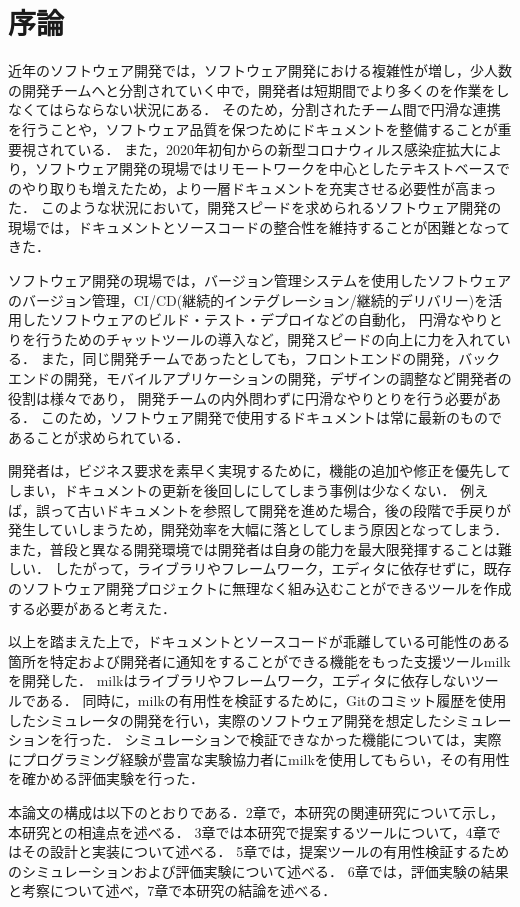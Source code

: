 \chapter{序論}
近年のソフトウェア開発では，ソフトウェア開発における複雑性が増し，少人数の開発チームへと分割されていく中で，開発者は短期間でより多くのを作業をしなくてはらならない状況にある．
そのため，分割されたチーム間で円滑な連携を行うことや，ソフトウェア品質を保つためにドキュメントを整備することが重要視されている．
また，2020年初旬からの新型コロナウィルス感染症拡大により，ソフトウェア開発の現場ではリモートワークを中心としたテキストベースでのやり取りも増えたため，より一層ドキュメントを充実させる必要性が高まった．
このような状況において，開発スピードを求められるソフトウェア開発の現場では，ドキュメントとソースコードの整合性を維持することが困難となってきた．

ソフトウェア開発の現場では，バージョン管理システムを使用したソフトウェアのバージョン管理，CI/CD(継続的インテグレーション/継続的デリバリー)を活用したソフトウェアのビルド・テスト・デプロイなどの自動化，
円滑なやりとりを行うためのチャットツールの導入など，開発スピードの向上に力を入れている．
また，同じ開発チームであったとしても，フロントエンドの開発，バックエンドの開発，モバイルアプリケーションの開発，デザインの調整など開発者の役割は様々であり，
開発チームの内外問わずに円滑なやりとりを行う必要がある．
このため，ソフトウェア開発で使用するドキュメントは常に最新のものであることが求められている．

開発者は，ビジネス要求を素早く実現するために，機能の追加や修正を優先してしまい，ドキュメントの更新を後回しにしてしまう事例は少なくない．
例えば，誤って古いドキュメントを参照して開発を進めた場合，後の段階で手戻りが発生していしまうため，開発効率を大幅に落としてしまう原因となってしまう．
また，普段と異なる開発環境では開発者は自身の能力を最大限発揮することは難しい．
したがって，ライブラリやフレームワーク，エディタに依存せずに，既存のソフトウェア開発プロジェクトに無理なく組み込むことができるツールを作成する必要があると考えた．

以上を踏まえた上で，ドキュメントとソースコードが乖離している可能性のある箇所を特定および開発者に通知をすることができる機能をもった支援ツールmilkを開発した．
milkはライブラリやフレームワーク，エディタに依存しないツールである．
同時に，milkの有用性を検証するために，Gitのコミット履歴を使用したシミュレータの開発を行い，実際のソフトウェア開発を想定したシミュレーションを行った．
シミュレーションで検証できなかった機能については，実際にプログラミング経験が豊富な実験協力者にmilkを使用してもらい，その有用性を確かめる評価実験を行った．

本論文の構成は以下のとおりである．2章で，本研究の関連研究について示し，本研究との相違点を述べる．
3章では本研究で提案するツールについて，4章ではその設計と実装について述べる．
5章では，提案ツールの有用性検証するためのシミュレーションおよび評価実験について述べる．
6章では，評価実験の結果と考察について述べ，7章で本研究の結論を述べる．